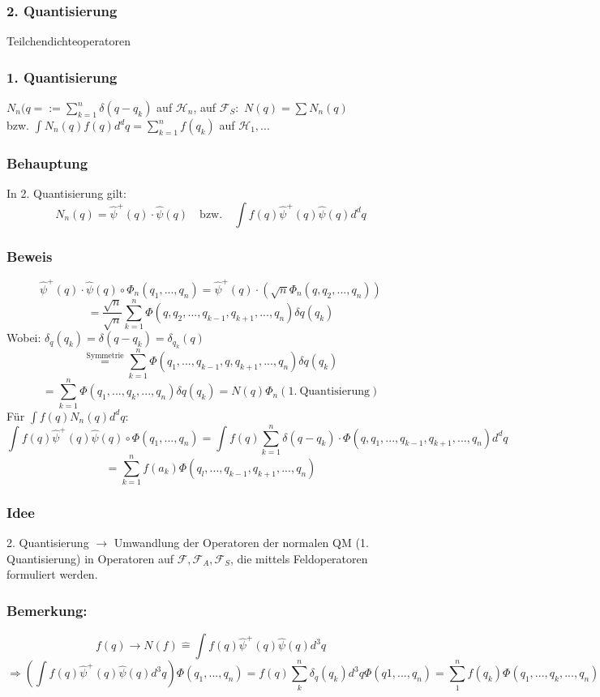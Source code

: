 \documentclass[twoside,a4paper]{scrartcl}
\renewcommand{\1}{\mathds{1}}
\newcommand{\Ra}{\Rightarrow}
\newcommand{\ra}{\rightarrow}
\renewcommand{\H}{\mathcal{H}}
\newcommand{\F}{\mathcal{F}}
\begin{document}
\subsubsection*{2. Quantisierung}
Teilchendichteoperatoren
\subsubsection*{1. Quantisierung}
$N_n(q=:=\sum_{k=1}^n\delta(q-q_k)$ auf $\H_n$, auf $\F_S:$ $N(q)=\sum N_n(q)$\\
bzw. $\int N_n(q) f(q)d^dq=\sum_{k=1}^n f(q_k)$ auf $\H_1,...$
\subsubsection*{Behauptung}
In 2. Quantisierung gilt:
$$N_n(q)=\hat \psi^+(q)\cdot \hat \psi(q) \quad \mathrm{bzw.} \quad \int f(q)\hat \psi^+(q)\hat\psi(q)d^dq$$
\subsubsection*{Beweis}
$$\hat \psi^+(q)\cdot \hat \psi(q)\circ \Phi_n(q_1,...,q_n)=\hat \psi^+(q)\cdot (\sqrt{n} \Phi_n(q,q_2,...,q_n))$$
$$=\frac{\sqrt{n}}{\sqrt{n}} \sum_{k=1}^n \Phi(q,q_2,...,q_{k-1},q_{k+1},...,q_n) \delta q(q_k)$$
Wobei: $\delta_q(q_k)=\delta(q-q_k)=\delta_{q_k}(q)$
$$\stackrel{\mathrm{Symmetrie}}{=}\sum_{k=1}^n \Phi(q_1,...,q_{k-1},q,q_{k+1},...,q_n) \delta q(q_k)$$
$$=\sum_{k=1}^n \Phi(q_1,...,q_k,...,q_n) \delta q(q_k)=N(q)\Phi_n(1. \ \mathrm{Quantisierung})$$
Für $\int f(q)N_n(q)d^dq$:
$$\int f(q)\hat \psi^+(q)\hat \psi(q) \circ \Phi(q_1,...,q_n)=\int f(q) \sum_{k=1}^n \delta(q-q_k) \cdot \Phi(q,q_1,...,q_{k-1},q_{k+1},...,q_n)d^dq$$
$$=\sum_{k=1}^n f(a_k) \Phi(q_l,...,q_{k-1},q_{k+1},...,q_n)$$
\subsubsection*{Idee}
2. Quantisierung $\ra$ Umwandlung der Operatoren der normalen QM (1. Quantisierung) in Operatoren auf $\F,\F_A,\F_S$, die mittels Feldoperatoren formuliert werden.
\subsubsection*{Bemerkung:}
$$f(q) \ra N(f) \mathrel{\widehat{=}} \int f(q) \hat \psi^+(q)\hat \psi(q)d^3q$$
$$\Ra (\int f(q) \hat \psi^+(q)\hat \psi(q)d^3q)\Phi(q_1,...,q_n)=f(q)\sum_k^n \delta_q(q_k)d^3q \Phi(q1,...,q_n)=\sum_1^n f(q_k)\Phi(q_1,...,q_k,...,q_n)$$
\end{document}
